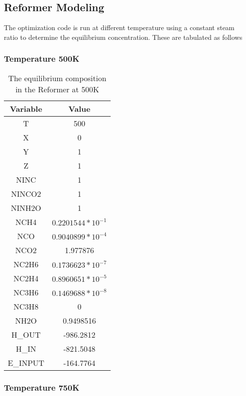\documentclass[journal=iecred,manuscript=article]{achemso}
\begin{document}
\subsection{Reformer Modeling}
The optimization code is run at different temperature using a constant steam ratio to determine the equilibrium concentration. These are tabulated as follows
\subsubsection{Temperature 500K}

\FloatBarrier
\begin{table}[H]
\caption{The equilibrium composition in the Reformer at 500K} 
\centering
\begin{tabular}{|c|c|}
\hline\hline %
Variable & Value \\ 
[1ex] %
\hline %
T	& 500 \\
\hline
X	 & 0 \\
\hline
Y	& 1 \\
\hline
Z	& 1 \\
\hline
NINC	& 1 \\
\hline
NINCO2	& 1 \\
\hline
NINH2O	& 1 \\
\hline
NCH4 &	$0.2201544*10^{-1}$ \\
\hline
NCO	& $0.9040899*10^{-4}$ \\
\hline
NCO2	& 1.977876 \\
\hline
NC2H6	& $0.1736623*10^{-7}$ \\
\hline
NC2H4	& $0.8960651*10^{-5}$ \\
\hline
NC3H6	& $0.1469688*10^{-8}$ \\
\hline
NC3H8	& 0 \\
\hline
NH2O	& 0.9498516 \\
\hline
H_{OUT}	& -986.2812 \\
\hline
H_{IN}	& -821.5048 \\
\hline
E_{INPUT}	& -164.7764 \\
\hline 

\end{tabular}
\end{table}
\FloatBarrier

\subsubsection{Temperature 750K}
\end{document}
